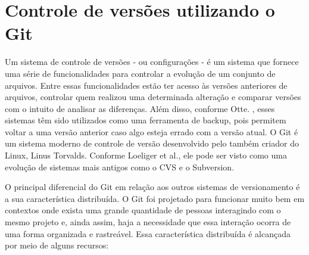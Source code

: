 \chapter{Controle de versões utilizando o Git}
\label{apendice_git}

Um sistema de controle de versões - ou configurações - é um sistema que fornece uma série de funcionalidades para controlar a evolução de um conjunto de arquivos. Entre essas funcionalidades estão ter acesso às versões anteriores de arquivos, controlar quem realizou uma determinada alteração e comparar versões com o intuito de analisar as diferenças.  Além disso, conforme Otte. \cite{otte2009version}, esses sistemas têm sido utilizados como uma ferramenta de backup, pois  permitem voltar a uma versão anterior caso algo esteja errado com a versão atual. O Git é um sistema moderno de controle de versão desenvolvido pelo também criador do Linux, Linus Torvalds. Conforme Loeliger et al.\cite{loeliger2012version}, ele pode ser visto como uma evolução de sistemas mais antigos como o CVS\cite{vesperman2006essential} e o Subversion\cite{pilato2008version}. 

O principal diferencial do Git em relação aos outros sistemas de versionamento é a sua característica distribuída. O Git foi projetado para funcionar muito bem em contextos onde exista uma grande quantidade de pessoas interagindo com o mesmo projeto e, ainda assim, haja a necessidade que essa interação ocorra de uma forma organizada e rastreável. Essa característica distribuída é alcançada por meio de alguns recursos:

